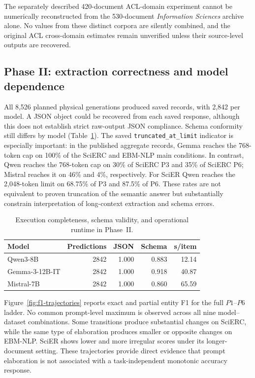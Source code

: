 \documentclass[fleqn,10pt]{wlscirep-authoryear}
\begin{document}
The separately described 420-document ACL-domain experiment cannot
be numerically reconstructed from the 530-document \emph{Information
Sciences} archive alone. No values from these distinct corpora are
silently combined, and the original ACL cross-domain estimates remain
unverified unless their source-level outputs are recovered.

\subsection{Phase II: extraction correctness and model dependence}

All 8,526 planned physical generations produced saved records, with 2,842 per
model. A JSON object could be recovered from each saved response, although
this does not establish strict raw-output JSON compliance. Schema conformity
still differs by model (Table~\ref{tab:execution}). The saved
\texttt{truncated\_at\_limit} indicator is especially important: in the
published aggregate records, Gemma reaches the 768-token cap on 100\% of the
SciERC and EBM-NLP main conditions. In contrast, Qwen reaches the 768-token
cap on 30\% of SciERC P3 and 35\% of SciERC P6; Mistral reaches it on
46\% and 4\%, respectively. For SciER Qwen reaches the 2,048-token limit on
68.75\% of P3 and 87.5\% of P6. These rates are not equivalent to proven
truncation of the semantic answer but substantially constrain interpretation of
long-context extraction and schema errors.

\begin{table}[t]
\centering
\caption{Execution completeness, schema validity, and operational runtime in
Phase~II.}
\label{tab:execution}
\begin{tabular}{lrrrr}
\toprule
Model & Predictions & JSON & Schema & s/item \\
\midrule
Qwen3-8B       & 2842 & 1.000 & 0.883 & 12.14 \\
Gemma-3-12B-IT & 2842 & 1.000 & 0.918 & 40.87 \\
Mistral-7B     & 2842 & 1.000 & 0.860 & 65.59 \\
\bottomrule
\end{tabular}
\end{table}

Figure~\ref{fig:f1-trajectories} reports exact and partial entity F1 for the full
$P1$--$P6$ ladder. No common prompt-level maximum is observed across all nine
model--dataset combinations. Some transitions produce substantial changes on
SciERC, while the same type of elaboration produces smaller or opposite changes
on EBM-NLP. SciER shows lower and more irregular scores under its longer-document
setting. These trajectories provide direct evidence that prompt elaboration is
not associated with a task-independent monotonic accuracy response.
\end{document}
